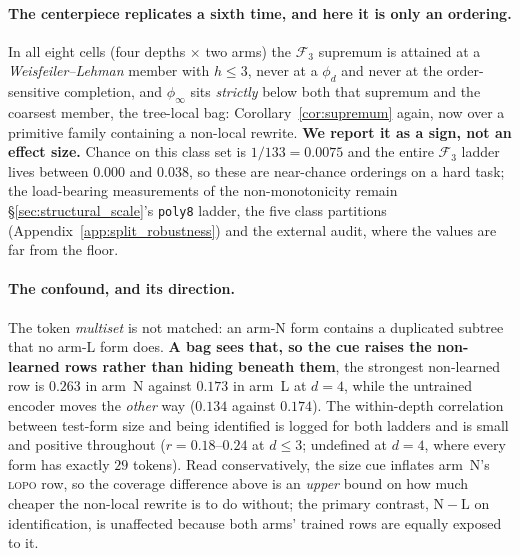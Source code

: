 \paragraph{The centerpiece replicates a sixth time, and here it is only an ordering.} In all eight cells (four depths $\times$ two arms) the $\mathcal{F}_3$ supremum is attained at a \emph{Weisfeiler--Lehman} member with $h\leq3$, never at a $\phi_d$ and never at the order-sensitive completion, and $\phi_\infty$ sits \emph{strictly} below both that supremum and the coarsest member, the tree-local bag: Corollary~\ref{cor:supremum} again, now over a primitive family containing a non-local rewrite. \textbf{We report it as a sign, not an effect size.} Chance on this class set is $1/133 = 0.0075$ and the entire $\mathcal{F}_3$ ladder lives between $0.000$ and $0.038$, so these are near-chance orderings on a hard task; the load-bearing measurements of the non-monotonicity remain \S\ref{sec:structural_scale}'s \texttt{poly8} ladder, the five class partitions (Appendix~\ref{app:split_robustness}) and the external audit, where the values are far from the floor.

\paragraph{The confound, and its direction.} The token \emph{multiset} is not matched: an arm-N form contains a duplicated subtree that no arm-L form does. \textbf{A bag sees that, so the cue raises the non-learned rows rather than hiding beneath them}, the strongest non-learned row is $0.263$ in arm~N against $0.173$ in arm~L at $d{=}4$, while the untrained encoder moves the \emph{other} way ($0.134$ against $0.174$). The within-depth correlation between test-form size and being identified is logged for both ladders and is small and positive throughout ($r{=}0.18$--$0.24$ at $d{\leq}3$; undefined at $d{=}4$, where every form has exactly $29$ tokens). Read conservatively, the size cue inflates arm~N's \textsc{lopo} row, so the coverage difference above is an \emph{upper} bound on how much cheaper the non-local rewrite is to do without; the primary contrast, $\mathrm{N}-\mathrm{L}$ on identification, is unaffected because both arms' trained rows are equally exposed to it.

